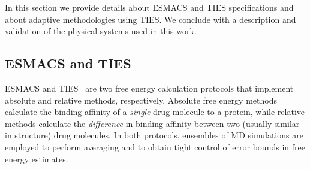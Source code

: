 In this section we provide details about ESMACS and TIES specifications and
about adaptive methodologies using TIES\@. We conclude with a description and
validation of the physical systems used in this work.





\subsection{ESMACS and TIES}\label{ssec:esm_ties}

ESMACS and TIES~\cite{Wan2017brd4, Bhati2017} are two free energy calculation
protocols that implement absolute and relative methods, respectively.
Absolute free energy methods calculate the binding affinity of a
\emph{single} drug molecule to a protein, while relative methods calculate
the \emph{difference} in binding affinity between two (usually similar in
structure) drug molecules. In both protocols, ensembles of MD simulations are
employed to perform averaging and to obtain tight control of error bounds in
free energy estimates.

